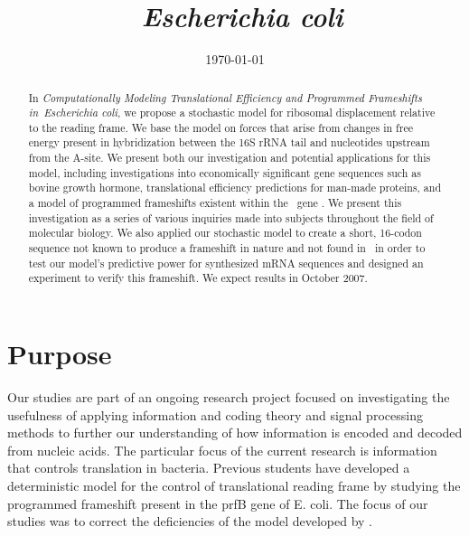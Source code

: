 \documentclass[12pt]{article}
\author{\sc{\BWFauthors}}
\date{{\sc \today}}
\title{\bf{\BWFtitle\ \emph{Escherichia coli}}}
\newcommand{\BWFtitle}{Computationally
  Modeling Translational Efficiency and Programmed Frameshifts in}
\numberwithin{equation}{section}
\begin{document}
\begin{singlespace}
  \maketitle
  \tableofcontents
\end{singlespace}

\clearpage
\begin{abstract}\begin{normalsize}
  In \emph{\BWFtitle\ Escherichia coli}, we propose a stochastic model
  for ribosomal displacement relative to the reading frame. We base
  the model on forces that arise from changes in free energy present
  in hybridization between the 16S rRNA tail and nucleotides upstream
  from the A-site.  We present both our investigation and potential
  applications for this model, including investigations into
  economically significant gene sequences such as bovine growth
  hormone, translational efficiency predictions for man-made proteins,
  and a model of programmed frameshifts existent within the
  \ecoli\ gene \prfB.  We present this investigation as a series of
  various inquiries made into subjects throughout the field of
  molecular biology.  We also applied our stochastic model to create a
  short, 16-codon sequence not known to produce a frameshift in nature
  and not found in \ecoli\ in order to test our model's predictive
  power for synthesized mRNA sequences and designed an experiment to
  verify this frameshift.  We expect results in October 2007.
\end{normalsize}\end{abstract}
\clearpage
{}

\section{Purpose}
Our studies are part of an ongoing research project focused on
investigating the usefulness of applying information and coding theory
and signal processing methods to further our understanding of how
information is encoded and decoded from nucleic acids.  The particular
focus of the current research is information that controls translation
in bacteria.  Previous students have developed a deterministic model
for the control of translational reading frame by studying the
programmed frameshift present in the prfB gene of E. coli.  The focus
of our studies was to correct the deficiencies of the model developed
by \citet{lalit:mechanics}.
\end{document}
